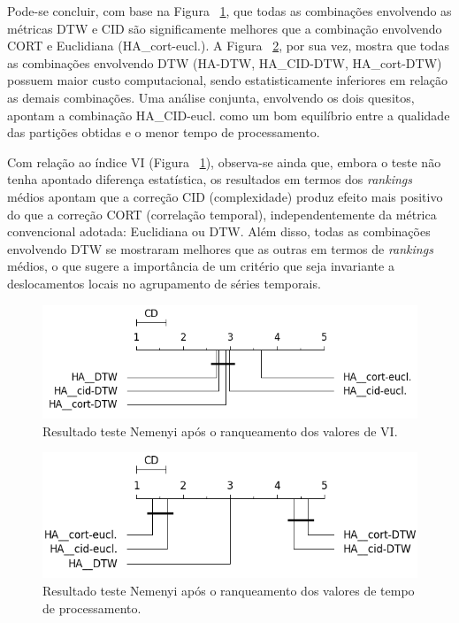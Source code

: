Pode-se concluir, com  base na Figura ~\ref{fig:VIP3}, que todas as combinações 
envolvendo as métricas DTW e CID são significamente melhores que a 
combinação envolvendo CORT e Euclidiana (HA\_cort-eucl.). 
A Figura ~\ref{fig:VIP4}, por sua vez, mostra que todas as combinações 
envolvendo DTW (HA-DTW, HA\_CID-DTW, HA\_cort-DTW) possuem maior custo computacional, 
sendo estatisticamente inferiores em relação as demais combinações. 
Uma análise conjunta, envolvendo os dois quesitos, apontam a combinação HA\_CID-eucl. 
como um bom equilíbrio entre a qualidade das partições obtidas e o menor tempo 
de processamento.

Com relação ao índice VI (Figura ~\ref{fig:VIP3}), observa-se ainda que, 
embora o teste não tenha apontado diferença estatística, os resultados 
em termos dos \textit{rankings} médios apontam que a correção CID (complexidade) 
produz efeito mais positivo do que a correção CORT (correlação temporal), 
independentemente da métrica convencional adotada: Euclidiana ou DTW. 
Além disso, todas as combinações envolvendo DTW se mostraram melhores 
que as outras em termos de \textit{rankings} médios, o que sugere a importância 
de um critério que seja invariante a deslocamentos locais no agrupamento 
de séries temporais.

\begin{figure}[h!]
	\includegraphics[width=\linewidth]{figuras/figure_combinacoes_4.png}	
	\caption{Resultado teste Nemenyi após o ranqueamento dos valores de VI.}
	\label{fig:VIP3}
\end{figure}

\begin{figure}[h!]	
	\includegraphics[width=\linewidth]{figuras/figure_combinacoes_3.png}
	\caption{Resultado teste Nemenyi após o ranqueamento dos valores de tempo de processamento.}
	\label{fig:VIP4}
\end{figure}


